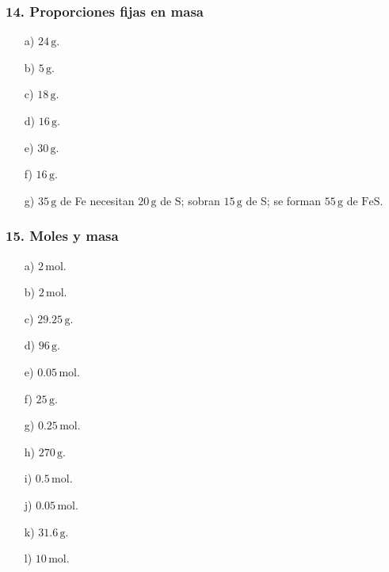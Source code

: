 \subsubsection*{14. Proporciones fijas en masa}
\begin{enumerate}
    \item[a)] $24\,\mathrm{g}$.
    \item[b)] $5\,\mathrm{g}$.
    \item[c)] $18\,\mathrm{g}$.
    \item[d)] $16\,\mathrm{g}$.
    \item[e)] $30\,\mathrm{g}$.
    \item[f)] $16\,\mathrm{g}$.
    \item[g)] $35\,\mathrm{g}$ de Fe necesitan $20\,\mathrm{g}$ de S;
    sobran $15\,\mathrm{g}$ de S;
    se forman $55\,\mathrm{g}$ de $\mathrm{FeS}$.
\end{enumerate}

\subsubsection*{15. Moles y masa}
\begin{enumerate}
    \item[a)] $2\,\mathrm{mol}$.
    \item[b)] $2\,\mathrm{mol}$.
    \item[c)] $29.25\,\mathrm{g}$.
    \item[d)] $96\,\mathrm{g}$.
    \item[e)] $0.05\,\mathrm{mol}$.
    \item[f)] $25\,\mathrm{g}$.
    \item[g)] $0.25\,\mathrm{mol}$.
    \item[h)] $270\,\mathrm{g}$.
    \item[i)] $0.5\,\mathrm{mol}$.
    \item[j)] $0.05\,\mathrm{mol}$.
    \item[k)] $31.6\,\mathrm{g}$.
    \item[l)] $10\,\mathrm{mol}$.
\end{enumerate}

